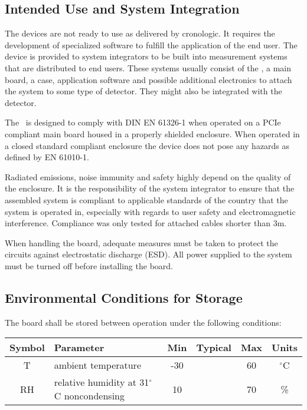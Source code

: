 \subsection{Intended Use and System Integration}

	The devices are not ready to use as delivered by cronologic. It requires the development of specialized software to fulfill the application of the end user. The device is provided to system integrators to be built into measurement systems that are distributed to end users. These systems usually consist of the \deviceName, a main board, a case, application software and possible additional electronics to attach the system to some type of detector. They might also be integrated with the detector.\par

	The \deviceName\ is designed to comply with DIN EN 61326-1 when operated on a PCIe compliant main board housed in a properly shielded enclosure. 
	When operated in a closed standard compliant enclosure the device does not pose any hazards as defined by EN 61010-1.\par

	Radiated emissions, noise immunity and safety highly depend on the quality of the enclosure. It is the responsibility of the system integrator to ensure that the assembled system is compliant to applicable standards of the country that the system is operated in, especially with regards to user safety and electromagnetic interference. Compliance was only tested for attached cables shorter than 3m.\par

	When handling the board, adequate measures must be taken to protect the circuits against electrostatic discharge (ESD). All power supplied to the system must be turned off before installing the board.

	\subsection{Environmental Conditions for Storage}

	The board shall be stored between operation under the following conditions:

	\noindent
	\begin{tabularx}{\textwidth}{|c|X|c|c|c|c|}
		\hline
		Symbol & Parameter & Min & Typical & Max & Units\\
		\hline\hline
		T & ambient temperature & -30 && 60 & $^{\circ}$C\\
		\hline
		RH & relative humidity at 31$^{\circ}$C noncondensing & 10 && 70 & \%\\
		\hline
	\end{tabularx}


